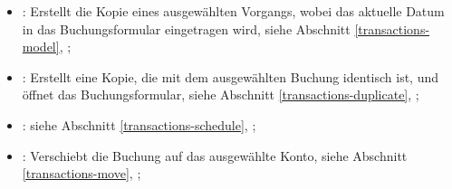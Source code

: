 \begin{itemize}
	\item {}: Erstellt die Kopie eines ausgewählten Vorgangs, wobei das aktuelle Datum in das Buchungsformular eingetragen wird, siehe Abschnitt \vref{transactions-model}, ;
	\item {}: Erstellt eine Kopie, die mit dem ausgewählten Buchung identisch ist, und öffnet das Buchungsformular, siehe Abschnitt \vref{transactions-duplicate}, ;
	\item {}: siehe Abschnitt \vref{transactions-schedule}, ;
	\item {}: Verschiebt die Buchung auf das ausgewählte Konto, siehe Abschnitt \vref{transactions-move}, ;

\end{itemize}
